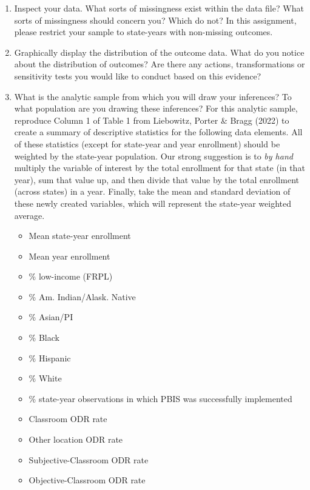 \documentclass[a4paper, 11pt]{article}
\begin{document}
\begin{enumerate}
	\item[B1.] Inspect your data. What sorts of missingness exist within the data file? What sorts of missingness should concern you? Which do not? In this assignment, please restrict your sample to state-years with non-missing outcomes.
	\item[B2.] Graphically display the distribution of the outcome data. What do you notice about the distribution of outcomes? Are there any actions, transformations or sensitivity tests you would like to conduct based on this evidence?
	\item[B3.] What is the analytic sample from which you will draw your inferences? To what population are you drawing these inferences? For this analytic sample, reproduce Column 1 of Table 1 from Liebowitz, Porter \& Bragg (2022) to create a summary of descriptive statistics for the following data elements. All of these statistics (except for state-year and year enrollment) should be weighted by the state-year population. Our strong suggestion is to \textit{by hand} multiply the variable of interest by the total enrollment for that state (in that year), sum that value up, and then divide that value by the total enrollment (across states) in a year. Finally, take the mean and standard deviation of these newly created variables, which will represent the state-year weighted average.

	\begin{itemize} 
		\item Mean state-year enrollment 
		\item Mean year enrollment
		\item \% low-income (FRPL)
		\item \% Am. Indian/Alask. Native
		\item \% Asian/PI
		\item \% Black
		\item \% Hispanic
		\item \% White
		\item \% state-year observations in which PBIS was successfully implemented
		\item Classroom ODR rate
		\item Other location ODR rate
		\item Subjective-Classroom ODR rate
		\item Objective-Classroom ODR rate
\end{itemize}


\end{enumerate}
\end{document}
